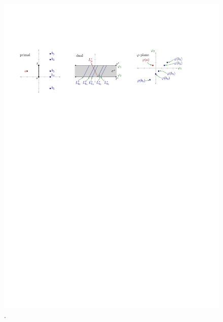 \documentclass[a4paper, 12pt]{book}
\begin{document}
\begin{figure}
\centerline{\includegraphics[scale=1.2]{pics/duality.pdf}}
\caption{.} 
\label{duality}
\end{figure}
\end{document}
